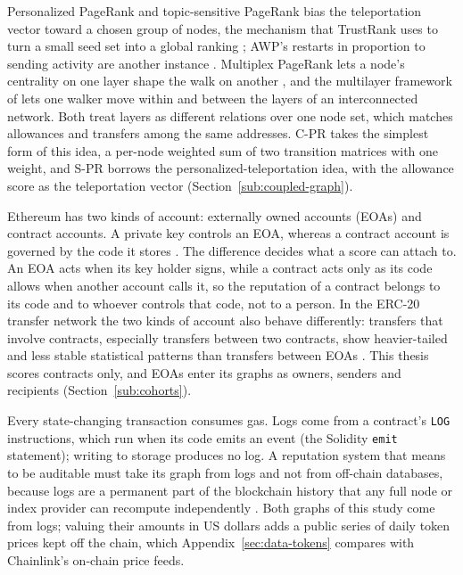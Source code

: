 Personalized PageRank \parencite{jeh2003personalized} and topic-sensitive PageRank \parencite{haveliwala2003topic} bias the teleportation vector toward a chosen group of nodes, the mechanism that TrustRank uses to turn a small seed set into a global ranking \parencite{gyongyi2004trustrank}; AWP's restarts in proportion to sending activity are another instance \parencite{do2023awp}. Multiplex PageRank lets a node's centrality on one layer shape the walk on another \parencite{halu2013multiplex}, and the multilayer framework of \textcite{dedomenico2015ranking} lets one walker move within and between the layers of an interconnected network. Both treat layers as different relations over one node set, which matches allowances and transfers among the same addresses. C-PR takes the simplest form of this idea, a per-node weighted sum of two transition matrices with one weight, and S-PR borrows the personalized-teleportation idea, with the allowance score as the teleportation vector (Section~\ref{sub:coupled-graph}).


Ethereum has two kinds of account: externally owned accounts (EOAs) and contract accounts. A private key controls an EOA, whereas a contract account is governed by the code it stores \parencite{antonopoulos2018mastering}. The difference decides what a score can attach to. An EOA acts when its key holder signs, while a contract acts only as its code allows when another account calls it, so the reputation of a contract belongs to its code and to whoever controls that code, not to a person. In the ERC-20 transfer network the two kinds of account also behave differently: transfers that involve contracts, especially transfers between two contracts, show heavier-tailed and less stable statistical patterns than transfers between EOAs \parencite{mukhia2026erc20}. This thesis scores contracts only, and EOAs enter its graphs as owners, senders and recipients (Section~\ref{sub:cohorts}).

Every state-changing transaction consumes gas. Logs come from a contract's \texttt{LOG} instructions, which run when its code emits an event (the Solidity \texttt{emit} statement); writing to storage produces no log. A reputation system that means to be auditable must take its graph from logs and not from off-chain databases, because logs are a permanent part of the blockchain history that any full node or index provider can recompute independently \parencite{narayanan2016bitcoin}. Both graphs of this study come from logs; valuing their amounts in US dollars adds a public series of daily token prices kept off the chain, which Appendix~\ref{sec:data-tokens} compares with Chainlink's on-chain price feeds.

